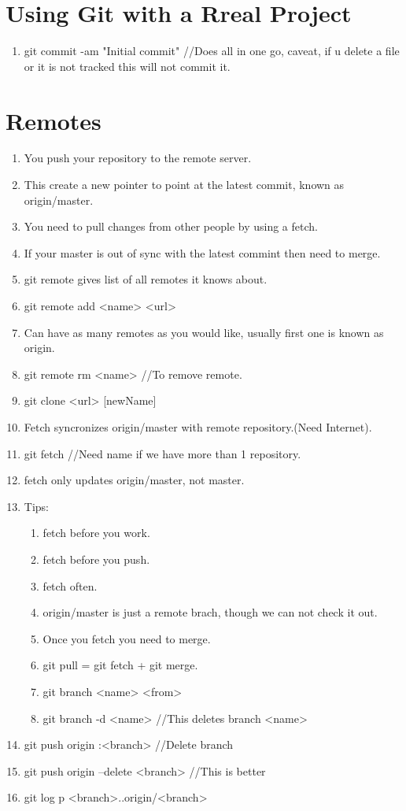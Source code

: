 \documentclass[a4paper, fontsize=12pt, twoside]{article} %
\begin{document}
\section{Using Git with a Rreal Project}
\begin{enumerate}
	\item git commit -am "Initial commit" //Does all in one go, caveat, if u delete a file or it is not tracked this will not commit it.
\end{enumerate}
	
\section{Remotes}
\begin{enumerate}
	\item You push your repository to the remote server.
	\item This create a new pointer to point at the latest commit, known as origin/master.
	\item You need to pull changes from other people by using a fetch.
	\item If your master is out of sync with the latest commint then need to merge.
	\item git remote gives list of all remotes it knows about.
	\item git remote add <name> <url>
	\item Can have as many remotes as you would like, usually first one is known as origin.
	\item git remote rm <name> //To remove remote.
		
	\item git clone <url> [newName]		
	\item Fetch syncronizes origin/master with remote repository.(Need Internet).
	\item git fetch //Need name if we have more than 1 repository.
	\item fetch only updates origin/master, not master.
	\item Tips:
		\begin{enumerate}
			\item fetch before you work.
			\item fetch before you push.
			\item fetch often.
			\item origin/master is just a remote brach, though we can not check it out.
			\item Once you fetch you need to merge.
			\item git pull = git fetch + git merge.
			\item git branch <name> <from>
			\item git branch -d <name> //This deletes branch <name>
		\end{enumerate}	
	\item git push origin :<branch> //Delete branch
	\item git push origin --delete <branch> //This is better
	\item git log p <branch>..origin/<branch>

	
\end{enumerate}
              
\end{document}
